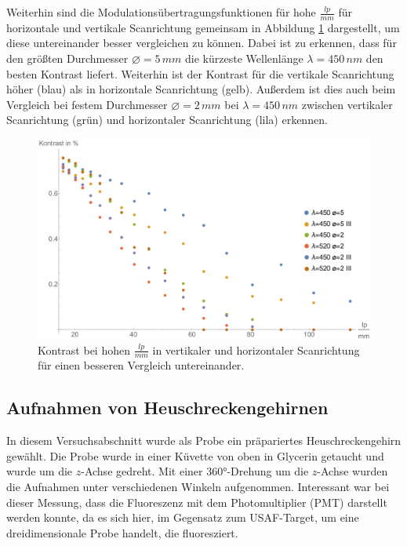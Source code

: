 Weiterhin sind die Modulationsübertragungsfunktionen für hohe $\frac{lp}{mm}$ für horizontale und vertikale Scanrichtung gemeinsam in Abbildung \ref{fig:Versuch2_Plot2_all} dargestellt, um diese untereinander besser vergleichen zu können.
Dabei ist zu erkennen, dass für den größten Durchmesser $\varnothing = 5 \, mm$ die kürzeste Wellenlänge $\lambda = 450 \, nm$ den besten Kontrast liefert. Weiterhin ist der Kontrast für die vertikale Scanrichtung höher (blau) als in horizontale Scanrichtung (gelb).
Außerdem ist dies auch beim Vergleich bei festem Durchmesser $\varnothing = 2 \, mm$ bei $\lambda = 450 \, nm$ zwischen vertikaler Scanrichtung (grün) und horizontaler Scanrichtung (lila) erkennen. 

\begin{figure}[H]
\centering
\includegraphics[width=1.0\linewidth]{IMAGE/Versuch2Plot2_all.pdf}
	\caption{Kontrast bei hohen $\frac{lp}{mm}$ in vertikaler und horizontaler Scanrichtung für einen besseren Vergleich untereinander.
	}
	\label{fig:Versuch2_Plot2_all}
\end{figure}



\subsection{Aufnahmen von Heuschreckengehirnen}
In diesem Versuchsabschnitt wurde als Probe ein präpariertes Heuschreckengehirn gewählt.
Die Probe wurde in einer Küvette von oben in Glycerin getaucht und wurde um die $z$-Achse gedreht.
Mit einer 360°-Drehung um die $z$-Achse wurden die Aufnahmen unter verschiedenen Winkeln aufgenommen.
Interessant war bei dieser Messung, dass die Fluoreszenz mit dem Photomultiplier (PMT) darstellt werden konnte, da es sich hier, im Gegensatz zum USAF-Target, um eine dreidimensionale Probe handelt, die fluoresziert.

